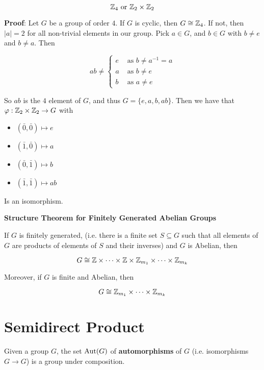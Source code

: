 \documentclass[12pt]{article}
\begin{document}
\[
  {\mathbb Z}_4 \text{ or } {\mathbb Z}_2 \times {\mathbb Z}_2
\]

{\bf Proof}: Let $G$ be a group of order $4$. If $G$ is cyclic, then $G \cong
{\mathbb Z}_4$. If not, then $|a| = 2$ for all non-trivial elements in our group. Pick $a
\in G$, and $b \in G$ with $b \ne e$ and $b \ne a$. Then

\[
  ab \ne \begin{cases}
    e & \text{ as } b \ne a^{-1} = a \\
    a & \text{ as } b \ne e \\
    b & \text{ as } a \ne e
  \end{cases}
\]

So $ab$ is the $4$ element of $G$, and thus $G = \{e, a, b, ab\}$. Then we have
that $\varphi: {\mathbb Z}_2 \times {\mathbb Z}_2 \to G$ with

\begin{itemize}
  \item $(\bar 0, \bar 0) \mapsto e$
  \item $(\bar 1, \bar 0) \mapsto a$
  \item $(\bar 0, \bar 1) \mapsto b$
  \item $(\bar 1, \bar 1) \mapsto ab$
\end{itemize}

Is an isomorphism.

{\bf Structure Theorem for Finitely Generated Abelian Groups}

If $G$ is finitely generated, (i.e. there is a finite set $S \subseteq G$ such
that all elements of $G$ are products of elements of $S$ and their inverses) and
$G$ is Abelian, then

\[
  G \cong {\mathbb Z} \times \cdots \times {\mathbb Z} \times {\mathbb Z}_{m_1} \times \cdots \times {\mathbb Z}_{m_k}
\]

Moreover, if $G$ is finite and Abelian, then

\[
  G \cong {\mathbb Z}_{m_1} \times \cdots \times {\mathbb Z}_{m_k}
\]


\section{Semidirect Product}

Given a group $G$, the set $\mathrm{Aut}(G)$ of {\bf automorphisms} of $G$ (i.e.
isomorphisms $G \to G$) is a group under composition.

\end{document}

